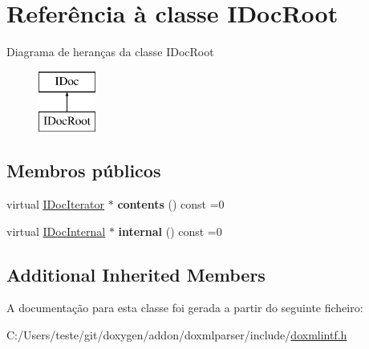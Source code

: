 \hypertarget{class_i_doc_root}{\section{Referência à classe I\-Doc\-Root}
\label{class_i_doc_root}
}
Diagrama de heranças da classe I\-Doc\-Root\begin{figure}[H]
\begin{center}
\leavevmode
\includegraphics[height=2.000000cm]{class_i_doc_root}
\end{center}
\end{figure}
\subsection*{Membros públicos}
\begin{DoxyCompactItemize}
\item 
\hypertarget{class_i_doc_root_aff89b69139ea695b04d666fe2c1f963b}{virtual \hyperlink{class_i_doc_iterator}{I\-Doc\-Iterator} $\ast$ {\bfseries contents} () const =0}\label{class_i_doc_root_aff89b69139ea695b04d666fe2c1f963b}

\item 
\hypertarget{class_i_doc_root_a7ab2b3fa1ceaafef96db28149f7312bd}{virtual \hyperlink{class_i_doc_internal}{I\-Doc\-Internal} $\ast$ {\bfseries internal} () const =0}\label{class_i_doc_root_a7ab2b3fa1ceaafef96db28149f7312bd}

\end{DoxyCompactItemize}
\subsection*{Additional Inherited Members}


A documentação para esta classe foi gerada a partir do seguinte ficheiro\-:\begin{DoxyCompactItemize}
\item 
C\-:/\-Users/teste/git/doxygen/addon/doxmlparser/include/\hyperlink{include_2doxmlintf_8h}{doxmlintf.\-h}\end{DoxyCompactItemize}
